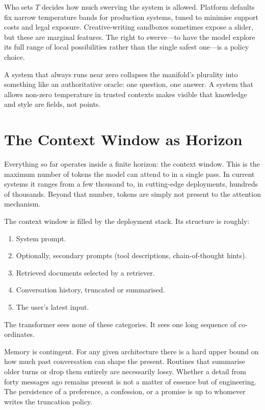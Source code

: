 \documentclass[12pt,a4paper]{article}
\begin{document}
Who sets $T$ decides how much swerving the system is allowed. Platform defaults fix narrow temperature bands for production systems, tuned to minimise support costs and legal exposure. Creative-writing sandboxes sometimes expose a slider, but these are marginal features. The right to swerve---to have the model explore its full range of local possibilities rather than the single safest one---is a policy choice.

A system that always runs near zero collapses the manifold's plurality into something like an authoritative oracle: one question, one answer. A system that allows non-zero temperature in trusted contexts makes visible that knowledge and style are fields, not points.

\section{The Context Window as Horizon}

Everything so far operates inside a finite horizon: the context window. This is the maximum number of tokens the model can attend to in a single pass. In current systems it ranges from a few thousand to, in cutting-edge deployments, hundreds of thousands. Beyond that number, tokens are simply not present to the attention mechanism.

The context window is filled by the deployment stack. Its structure is roughly:
\begin{enumerate}
\item System prompt.
\item Optionally, secondary prompts (tool descriptions, chain-of-thought hints).
\item Retrieved documents selected by a retriever.
\item Conversation history, truncated or summarised.
\item The user's latest input.
\end{enumerate}

The transformer sees none of these categories. It sees one long sequence of co-ordinates.

Memory is contingent. For any given architecture there is a hard upper bound on how much past conversation can shape the present. Routines that summarise older turns or drop them entirely are necessarily lossy. Whether a detail from forty messages ago remains present is not a matter of essence but of engineering. The persistence of a preference, a confession, or a promise is up to whomever writes the truncation policy.
\end{document}
